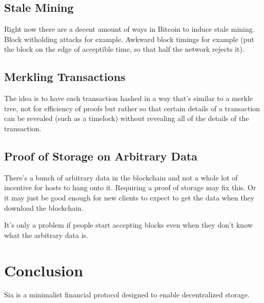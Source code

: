 \documentclass[twocolumn]{article}
\begin{document}
\subsection{Stale Mining}
Right now there are a decent amount of ways in Bitcoin to induce stale mining.
Block witholding attacks for example.
Awkward block timings for example (put the block on the edge of acceptible time, so that half the network rejects it).

\subsection{Merkling Transactions}
The idea is to have each transaction hashed in a way that's similar to a merkle tree, not for efficiency of proofs but rather so that certain details of a transaction can be revealed (such as a timelock) without revealing all of the details of the transaction.

\subsection{Proof of Storage on Arbitrary Data}
There's a bunch of arbitrary data in the blockchain and not a whole lot of incentive for hosts to hang onto it.
Requiring a proof of storage may fix this.
Or it may just be good enough for new clients to expect to get the data when they download the blockchain.

It's only a problem if people start accepting blocks even when they don't know what the arbitrary data is.


\section{Conclusion}
Sia is a minimalist financial protocol designed to enable decentralized storage.



\end{document}
